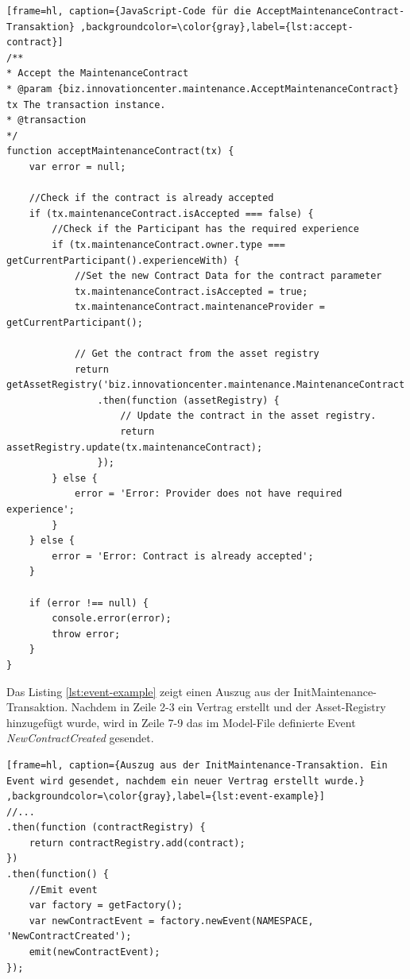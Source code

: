 \begin{lstfloat}
\begin{lstlisting}[frame=hl, caption={JavaScript-Code für die AcceptMaintenanceContract-Transaktion} ,backgroundcolor=\color{gray},label={lst:accept-contract}]
/**
* Accept the MaintenanceContract
* @param {biz.innovationcenter.maintenance.AcceptMaintenanceContract} tx The transaction instance.
* @transaction
*/
function acceptMaintenanceContract(tx) {
    var error = null;

    //Check if the contract is already accepted
    if (tx.maintenanceContract.isAccepted === false) {
        //Check if the Participant has the required experience
        if (tx.maintenanceContract.owner.type === getCurrentParticipant().experienceWith) {
            //Set the new Contract Data for the contract parameter
            tx.maintenanceContract.isAccepted = true;
            tx.maintenanceContract.maintenanceProvider = getCurrentParticipant();

            // Get the contract from the asset registry
            return getAssetRegistry('biz.innovationcenter.maintenance.MaintenanceContract')
                .then(function (assetRegistry) {
                    // Update the contract in the asset registry.
                    return assetRegistry.update(tx.maintenanceContract);
                });
        } else {
            error = 'Error: Provider does not have required experience';
        }
    } else {
        error = 'Error: Contract is already accepted';
    }

    if (error !== null) {
        console.error(error);
        throw error;
    }
}
\end{lstlisting} 
\end{lstfloat}

Das Listing \ref{lst:event-example} zeigt einen Auszug aus der InitMaintenance-Transaktion. Nachdem in Zeile 2-3 ein Vertrag erstellt und der Asset-Registry hinzugefügt wurde, wird in Zeile 7-9 das im Model-File definierte Event \textit{NewContractCreated} gesendet.

\begin{lstfloat}
\begin{lstlisting}[frame=hl, caption={Auszug aus der InitMaintenance-Transaktion. Ein Event wird gesendet, nachdem ein neuer Vertrag erstellt wurde.} ,backgroundcolor=\color{gray},label={lst:event-example}]
//...
.then(function (contractRegistry) {
    return contractRegistry.add(contract);
})
.then(function() {
    //Emit event
    var factory = getFactory();
    var newContractEvent = factory.newEvent(NAMESPACE, 'NewContractCreated');
    emit(newContractEvent);
});
\end{lstlisting} 
\end{lstfloat}

